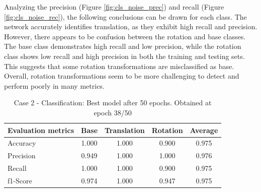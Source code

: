 Analyzing the precision (Figure \ref{fig:cls_noise_prec}) and recall (Figure \ref{fig:cls_noise_rec}), the following conclusions can be drawn for each class. The network accurately identifies translation, as they exhibit high recall and precision. However, there appears to be confusion between the rotation and base classes. The base class demonstrates high recall and low precision, while the rotation class shows low recall and high precision in both the training and testing sets. This suggests that some rotation transformations are misclassified as base. Overall, rotation transformations seem to be more challenging to detect and perform poorly in many metrics.\\

\begin{table}[ht]
        \begin{center}
                \begin{tabular}{|l||c|c|c|c|}
                        \hline 
                        Evaluation metrics & Base & Translation & Rotation & Average \\
                        \hline \hline
                        Accuracy  & 1.000 & 1.000 &  0.900 &  0.975\\
                        \hline
                        Precision & 0.949 &  1.000 &  1.000 &  0.976\\
                        \hline
                        Recall & 1.000&  1.000& 0.900 & 0.975 \\
                        \hline
                        f1-Score &  0.974&  1.000 & 0.947 & 0.975 \\
                        \hline
                \end{tabular}
        \end{center}
        \caption{Case 2 - Classification: Best model after 50 epochs. Obtained at epoch 38/50 }
        \label{tab:cls_flow_noise}
\end{table}

